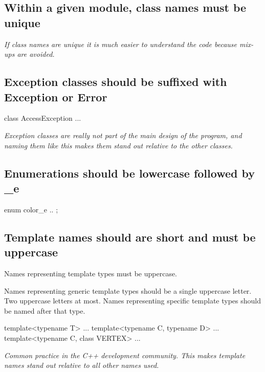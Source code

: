 \documentclass[a4paper,11pt,oneside]{scrbook}
\newcommand{\guideline}[1]{{\subsection{#1}}}
\newcommand{\motivation}[1]{{\normalfont \itshape #1}}
\newcommand{\trcode}[1]{{\normalfont \ttfamily #1}}
\begin{document}
\guideline{Within a given module, class names must be unique}
\label{subsec:unique-class-name}

\motivation{
  If class names are unique it is much easier to understand the code because
  mix-ups are avoided.
}

\guideline{Exception classes should be suffixed with \trcode{Exception} or \trcode{Error}}

\begin{code}
  class AccessException {
    ...
  }
\end{code}

\motivation{ 
  Exception classes are really not part of the main design of the program, and
  naming them like this makes them stand out relative to the other classes.
}

\guideline{Enumerations should be lowercase followed by \trcode{\_e}}

\begin{code}
  enum color_e {
    ..
  };
\end{code}

\guideline{Template names should are short and must be uppercase}

Names representing template types must be uppercase.

Names representing generic template types should be a single uppercase
letter. Two uppercase letters at most. Names representing specific template
types should be named after that type.

\begin{code}
  template<typename T> ... 
  template<typename C, typename D> ... 
  template<typename C, class VERTEX> ...
\end{code}

\motivation{ 
  Common practice in the C++ development community. This makes template names
  stand out relative to all other names used.
}
\end{document}
